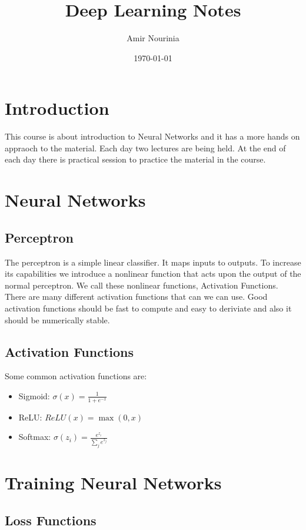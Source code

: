 \documentclass[a4paper,12pt]{article}
\title{Deep Learning Notes}
\author{Amir Nourinia}
\date{\today}
\begin{document}
\maketitle

\tableofcontents

\newpage

\section{Introduction}
This course is about introduction to Neural Networks and
it has a more hands on appraoch to the material. Each day two lectures are being held.
At the end of each day there is practical session to practice the material in the course.

\section{Neural Networks}

\subsection{Perceptron}
The perceptron is a simple linear classifier. It maps inputs to outputs. To increase its capabilities we
introduce a nonlinear function that acts upon the output of the normal perceptron. We call these nonlinear functions, Activation Functions.
There are many different activation functions that can we can use. Good activation functions should be fast to compute and easy to deriviate
and also it should be numerically stable.

\subsection{Activation Functions}
Some common activation functions are:
\begin{itemize}
  \item Sigmoid: $\sigma(x) = \frac{1}{1+e^{-x}}$
  \item ReLU: $ReLU(x) = \max(0, x)$
  \item Softmax: $\sigma(z_i) = \frac{e^{z_i}}{\sum_{j} e^{z_j}}$
\end{itemize}

\section{Training Neural Networks}

\subsection{Loss Functions}
\end{document}
